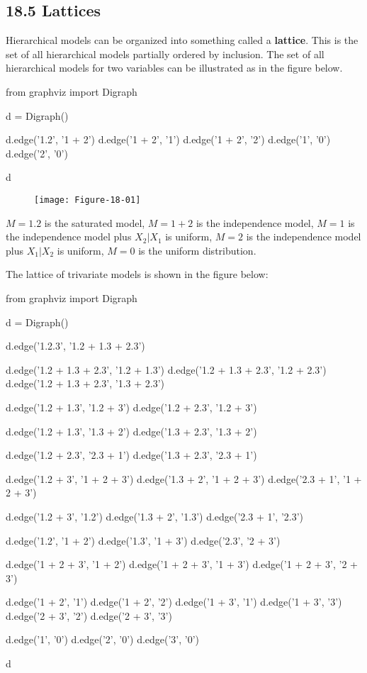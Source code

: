 \subsection*{18.5 Lattices}\label{lattices}

Hierarchical models can be organized into something called a
\textbf{lattice}. This is the set of all hierarchical models partially
ordered by inclusion. The set of all hierarchical models for two
variables can be illustrated as in the figure below.

\begin{python}
from graphviz import Digraph

d = Digraph()

d.edge('1.2', '1 + 2')
d.edge('1 + 2', '1')
d.edge('1 + 2', '2')
d.edge('1', '0')
d.edge('2', '0')

d
\end{python}
 
\begin{figure}[H]
\centering
\texttt{[image: Figure-18-01]}
\end{figure}

\(M = 1.2\) is the saturated model, \(M = 1 + 2\) is the independence
model, \(M = 1\) is the independence model plus \(X_{2} | X_{1}\) is
uniform, \(M = 2\) is the independence model plus \(X_{1} | X_{2}\) is
uniform, \(M = 0\) is the uniform distribution.

The lattice of trivariate models is shown in the figure below:

\begin{python}
from graphviz import Digraph

d = Digraph()

d.edge('1.2.3', '1.2 + 1.3 + 2.3')

d.edge('1.2 + 1.3 + 2.3', '1.2 + 1.3')
d.edge('1.2 + 1.3 + 2.3', '1.2 + 2.3')
d.edge('1.2 + 1.3 + 2.3', '1.3 + 2.3')

d.edge('1.2 + 1.3', '1.2 + 3')
d.edge('1.2 + 2.3', '1.2 + 3')

d.edge('1.2 + 1.3', '1.3 + 2')
d.edge('1.3 + 2.3', '1.3 + 2')

d.edge('1.2 + 2.3', '2.3 + 1')
d.edge('1.3 + 2.3', '2.3 + 1')

d.edge('1.2 + 3', '1 + 2 + 3')
d.edge('1.3 + 2', '1 + 2 + 3')
d.edge('2.3 + 1', '1 + 2 + 3')

d.edge('1.2 + 3', '1.2')
d.edge('1.3 + 2', '1.3')
d.edge('2.3 + 1', '2.3')

d.edge('1.2', '1 + 2')
d.edge('1.3', '1 + 3')
d.edge('2.3', '2 + 3')

d.edge('1 + 2 + 3', '1 + 2')
d.edge('1 + 2 + 3', '1 + 3')
d.edge('1 + 2 + 3', '2 + 3')

d.edge('1 + 2', '1')
d.edge('1 + 2', '2')
d.edge('1 + 3', '1')
d.edge('1 + 3', '3')
d.edge('2 + 3', '2')
d.edge('2 + 3', '3')

d.edge('1', '0')
d.edge('2', '0')
d.edge('3', '0')

d
\end{python}
 
